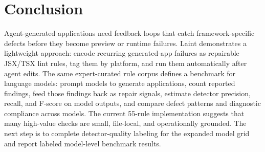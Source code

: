 \documentclass[11pt]{article}
\begin{document}
\section{Conclusion}

Agent-generated applications need feedback loops that catch framework-specific defects before they become preview or runtime failures. Laint demonstrates a lightweight approach: encode recurring generated-app failures as repairable JSX/TSX lint rules, tag them by platform, and run them automatically after agent edits. The same expert-curated rule corpus defines a benchmark for language models: prompt models to generate applications, count reported findings, feed those findings back as repair signals, estimate detector precision, recall, and F-score on model outputs, and compare defect patterns and diagnostic compliance across models. The current 55-rule implementation suggests that many high-value checks are small, file-local, and operationally grounded. The next step is to complete detector-quality labeling for the expanded model grid and report labeled model-level benchmark results.



\end{document}
